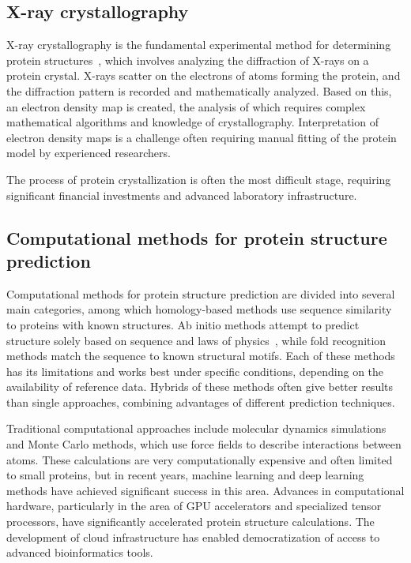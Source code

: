 \subsection{X-ray crystallography}
X-ray crystallography is the fundamental experimental method for determining protein structures~\cite{xray_crystallography}, which involves analyzing the diffraction of X-rays on a protein crystal.
X-rays scatter on the electrons of atoms forming the protein, and the diffraction pattern is recorded and mathematically analyzed.
Based on this, an electron density map is created, the analysis of which requires complex mathematical algorithms and knowledge of crystallography.
Interpretation of electron density maps is a challenge often requiring manual fitting of the protein model by experienced researchers.

The process of protein crystallization is often the most difficult stage, requiring significant financial investments and advanced laboratory infrastructure.

\subsection{Computational methods for protein structure prediction}
Computational methods for protein structure prediction are divided into several main categories, among which homology-based methods use sequence similarity to proteins with known structures.
Ab initio methods attempt to predict structure solely based on sequence and laws of physics~\cite{ab_initio_protein_folding}, while fold recognition methods match the sequence to known structural motifs.
Each of these methods has its limitations and works best under specific conditions, depending on the availability of reference data.
Hybrids of these methods often give better results than single approaches, combining advantages of different prediction techniques.

Traditional computational approaches include molecular dynamics simulations and Monte Carlo methods, which use force fields to describe interactions between atoms.
These calculations are very computationally expensive and often limited to small proteins, but in recent years, machine learning and deep learning methods have achieved significant success in this area.
Advances in computational hardware, particularly in the area of GPU accelerators and specialized tensor processors, have significantly accelerated protein structure calculations.
The development of cloud infrastructure has enabled democratization of access to advanced bioinformatics tools.

